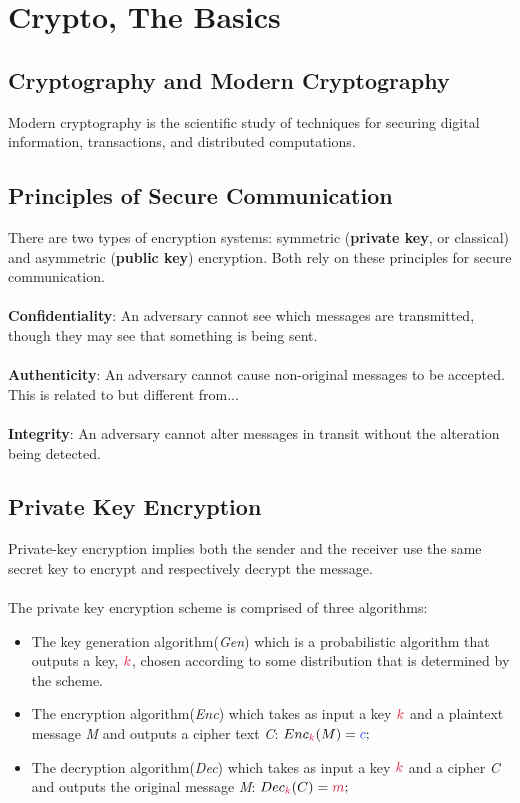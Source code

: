 \chapter{Crypto, The Basics}
\section{Cryptography and Modern Cryptography}
    
    Modern cryptography is the scientific study of techniques for securing digital information, transactions, and distributed computations.
    
\section{Principles of Secure Communication}
    There are two types of encryption systems: symmetric (\textbf{private key}, or classical) and asymmetric (\textbf{public key}) encryption. Both rely on these principles for secure communication.\\
    \\
    \textbf{Confidentiality}: An adversary cannot see which messages are transmitted, though they may see that something is being sent.\\
    \\
    \textbf{Authenticity}: An adversary cannot cause non-original messages to be accepted. This is related to but different from...\\
    \\
    \textbf{Integrity}: An adversary cannot alter messages in transit without the alteration being detected.\\

\section{Private Key Encryption}

    Private-key encryption implies both the sender and the receiver use the same secret key to encrypt and respectively decrypt the message.\\
    \\
    The private key encryption scheme is comprised of three algorithms:
    
    \begin{itemize}
      \item The key generation algorithm(\textit{Gen}) which is a probabilistic algorithm that outputs a key, $\ck$, chosen according to some distribution that is determined by the scheme.
      \item The encryption algorithm(\textit{Enc}) which takes as input a key $\ck$ and a plaintext message \textit{M} and outputs a cipher text \textit{C}: $Enc_\ck(M) = \cc;$
      \item The decryption algorithm(\textit{Dec}) which takes as input a key $\ck$ and a cipher \textit{C} and outputs the original message \textit{M}: $Dec_\ck(C) = \cm;$
    \end{itemize}
    
